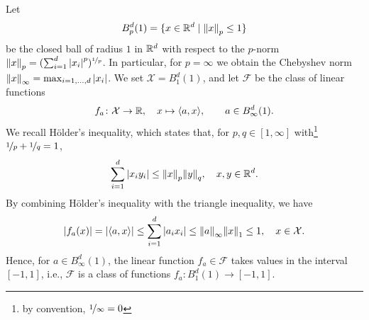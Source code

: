 \begin{example}
\label{ex: linear functions f_a}
Let
\[
    B_p^d(1) = \{x \in \mathbb{R}^d \mathrel{|} \norm{x}_p \leq 1\}
\]
be the closed ball of radius $1$ in $\mathbb{R}^d$ with respect to the $p$-norm $\norm{x}_p = (\sum_{i=1}^d \abs{x_i}^p)^{\nicefrac{1}{p}}$. In particular, for $p = \infty$ we obtain the Chebyshev norm $\norm{x}_{\infty} = \max_{i=1, \dots, d} \abs{x_i}$. We set $\mathcal{X} = B_1^d(1)$, and let $\mathcal{F}$ be the class of linear functions
\[
    f_a \colon \mathcal{X} \to \mathbb{R}, \quad x \mapsto \langle a, x \rangle, \qquad a \in B_{\infty}^d(1).
\]
We recall H{\"o}lder's inequality, which states that, for $p, q \in [1, \infty]$ with\footnote{by convention, $\nicefrac{1}{\infty} = 0$} $\nicefrac{1}{p} + \nicefrac{1}{q} = 1$,
\[
    \sum_{i=1}^d \abs{x_i y_i} \leq \norm{x}_p \norm{y}_q, \quad x, y \in \mathbb{R}^d.
\]
By combining H{\"o}lder's inequality with the triangle inequality, we have
\[
    \abs{f_a(x)} = \abs{\langle a, x \rangle} \leq \sum_{i=1}^d \abs{a_i x_i} \leq \norm{a}_{\infty} \norm{x}_1 \leq 1, \quad x \in \mathcal{X}.
\]
Hence, for $a \in B_{\infty}^d(1)$, the linear function $f_a \in \mathcal{F}$ takes values in the interval $[-1, 1]$, i.e., $\mathcal{F}$ is a class of functions $f_a \colon B_1^d(1) \to [-1, 1]$.
\end{example}
